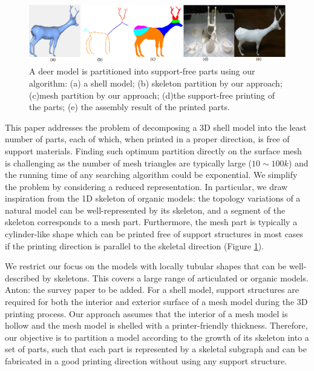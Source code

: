 \begin{figure}[t]
  \centering
  \includegraphics[width=\linewidth]{figs/tree_with_skeleton.png}
  \caption{\label{fig:ex1}%
  A deer model is partitioned into support-free parts using our algorithm: (a) a shell model; (b) skeleton partition by our approach; (c)mesh partition by our approach; (d)the support-free printing of the parts; (e) the assembly result of the printed parts.}
\end{figure}


This paper addresses the problem of decomposing a 3{D} {\color{red} shell model} into the least number of parts, each of which, when printed in a proper direction, is free of support materials. {Finding such optimum partition directly on the surface mesh is challenging as the number of mesh triangles are typically large ($10\sim100k$) and {\color{red}the running time of any searching algorithm could be exponential}. We simplify the problem by considering a reduced representation. In particular,} we draw inspiration from the 1{D} skeleton of organic models: the topology variations of a natural model can be well-represented by its skeleton, and a {segment} of the skeleton corresponds to a mesh part. Furthermore, the mesh part is typically a cylinder-like shape which can be printed free of support structures in most cases if the printing direction is parallel to the skeletal direction (Figure \ref{fig:ex1}).

{\color{red} We restrict our focus on {the models with locally tubular shapes that} can be well-described by skeletons. This covers a large range of articulated or organic models. Anton: the survey paper to be added}. {{For a shell model}}, support structures are required for both the interior and exterior surface of a mesh model during the 3{D} printing process. Our approach assumes that the interior of a mesh model is hollow and the mesh model is shelled with a printer-friendly thickness. Therefore, our objective is to partition a model according to the growth of its skeleton into a set of parts, such that each part is represented by a skeletal subgraph and can be fabricated in a good printing direction without using any support structure. %


